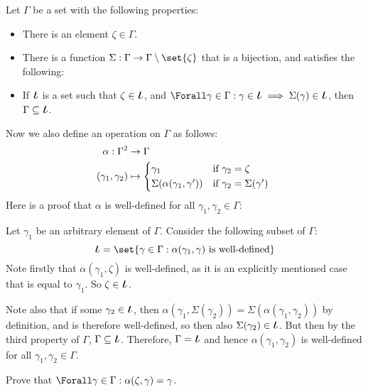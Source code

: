 \begin{enumerate}
  Let \(\Gamma\) be a set with the following properties:
  \begin{itemize}
   \item
    There is an element \(\zeta \in \Gamma\).
   \item
    There is a function \(\Sigma: \Gamma \to \Gamma \setminus \set{\zeta}\) that
    is a bijection, and satisfies the following:
   \item
    If \(\BigIota\) is a set such that \(\zeta \in \BigIota\), and
    \(\Forall \gamma \in \Gamma :
      \gamma \in \BigIota
      \implies \Sigma(\gamma) \in \BigIota\),
    then \(\Gamma \subseteq \BigIota\).
  \end{itemize}
  Now we also define an operation  on \(\Gamma\) as follows:
  \begin{align*}
   \alpha: \Gamma^2 &\to \Gamma \\
   (\gamma_1, \gamma_2) &\mapsto
   \begin{cases*}
    \gamma_1 & if \(\gamma_2 = \zeta\) \\
    \Sigma(\alpha(\gamma_1, \gamma')) & if \(\gamma_2 = \Sigma(\gamma')\)
   \end{cases*}
  \end{align*}
  Here is a proof that \(\alpha\) is well-defined for all
  \(\gamma_1, \gamma_2 \in \Gamma\):
  \begin{tcolorbox}
   Let \(\gamma_1\) be an arbitrary element of \(\Gamma\). Consider the
   following subset of \(\Gamma\):
   \begin{equation*}
    \BigIota
    = \set{\gamma \in \Gamma :
    \text{\(\alpha(\gamma_1, \gamma)\) is well-defined}}
   \end{equation*}
   Note firstly that \(\alpha(\gamma_1, \zeta)\) is well-defined, as it is an
   explicitly mentioned case that is equal to \(\gamma_1\). So
   \(\zeta \in \BigIota\).

   Note also that if some \(\gamma_2 \in \BigIota\), then
   \(\alpha(\gamma_1, \Sigma(\gamma_2)) = \Sigma(\alpha(\gamma_1, \gamma_2))\)
   by definition, and is therefore well-defined, so then also
   \(\Sigma(\gamma_2) \in \BigIota\). But then by the third property of
   \(\Gamma\), \(\Gamma \subseteq \BigIota\). Therefore, \(\Gamma = \BigIota\)
   and hence \(\alpha(\gamma_1, \gamma_2)\) is well-defined for all
   \(\gamma_1, \gamma_2 \in \Gamma\).
  \end{tcolorbox}
  Prove that \(\Forall \gamma \in \Gamma : \alpha(\zeta, \gamma) = \gamma\).


\end{enumerate}
